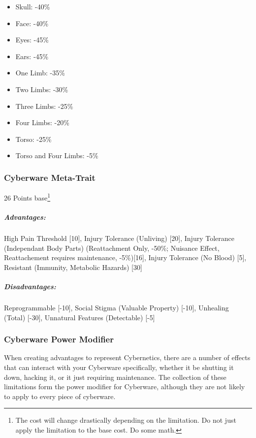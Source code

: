 \begin{multicols*}{3}
	\begin{itemize}
		\itemsep0em 
		\item Skull: -40\%
		\item Face: -40\%
		\item Eyes: -45\%
		\item Ears: -45\%
		\item One Limb: -35\%
		\item Two Limbs: -30\%
		\item Three Limbs: -25\%
		\item Four Limbs: -20\%
		\item Torso: -25\%
		\item Torso and Four Limbs: -5\%
	\end{itemize}
	
	\subsubsection*{Cyberware Meta-Trait}
	\begin{flushright}
		26 Points base\footnote{The cost will change drastically depending on the limitation. Do not just apply the limitation to the base cost. Do some math.}
	\end{flushright}
	\subparagraph{Advantages:}
	High Pain Threshold [10], Injury Tolerance (Unliving) [20], Injury Tolerance (Independant Body Parts) (Reattachment Only, -50\%; Nuisance Effect, Reattachement requires maintenance, -5\%)[16], Injury Tolerance (No Blood) [5], Resistant (Immunity, Metabolic Hazards) [30]
	\subparagraph{Disadvantages:}
	Reprogrammable [-10], Social Stigma (Valuable Property) [-10], Unhealing (Total) [-30], Unnatural Features (Detectable) [-5]
	
	\subsubsection{Cyberware Power Modifier}
	
	When creating advantages to represent Cybernetics, there are a number of effects that can interact with your Cyberware specifically, whether it be shutting it down, hacking it, or it just requiring maintenance. The collection of these limitations form the power modifier for Cyberware, although they are not likely to apply to every piece of cyberware.
	

\end{multicols*}
